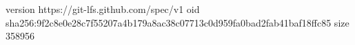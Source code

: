 version https://git-lfs.github.com/spec/v1
oid sha256:9f2c8e0e28c7f55207a4b179a8ac38c07713c0d959fa0bad2fab41baf18ffc85
size 358956
